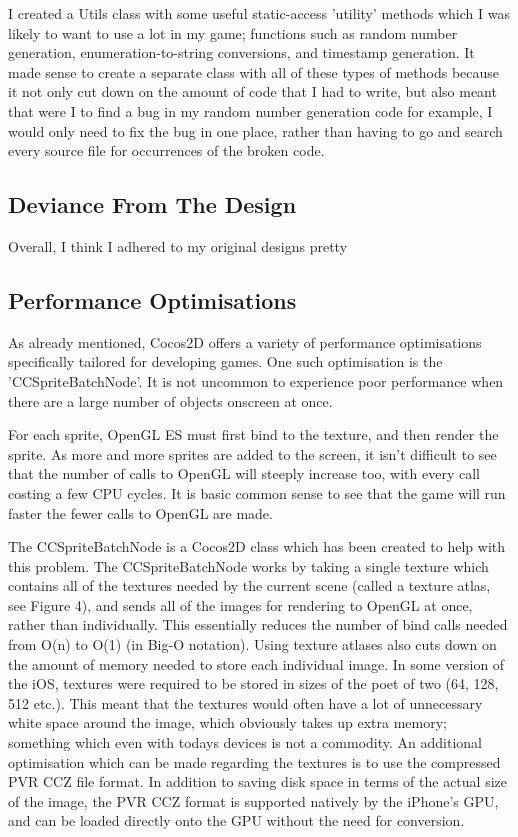 \documentclass[a4paper,oneside]{report}
\begin{document}
I created a Utils class with some useful static-access 'utility' methods which I was likely to want to use a lot in my game; functions such as random number generation, enumeration-to-string conversions, and timestamp generation. It made sense to create a separate class with all of these types of methods because it not only cut down on the amount of code that I had to write, but also meant that were I to find a bug in my random number generation code for example, I would only need to fix the bug in one place, rather than having to go and search every source file for occurrences of the broken code. 
		
\subsection{Deviance From The Design} 

Overall, I think I adhered to my original designs pretty 

\subsection{Performance Optimisations} 

As already mentioned, Cocos2D offers a variety of performance optimisations specifically tailored for developing games. One such optimisation is the 'CCSpriteBatchNode'. It is not uncommon to experience poor performance when there are a large number of objects onscreen at once. 

For each sprite, OpenGL ES must first bind to the texture, and then render the sprite. As more and more sprites are added to the screen, it isn't difficult to see that the number of calls to OpenGL will steeply increase too, with every call costing a few CPU cycles. It is basic common sense to see that the game will run faster the fewer calls to OpenGL are made. 

The CCSpriteBatchNode is a Cocos2D class which has been created to help with this problem. The CCSpriteBatchNode works by taking a single texture which contains all of the textures needed by the current scene (called a texture atlas, see Figure 4), and sends all of the images for rendering to OpenGL at once, rather than individually. This essentially reduces the number of bind calls needed from O(n) to O(1) (in Big-O notation). Using texture atlases also cuts down on the amount of memory needed to store each individual image. In some version of the iOS, textures were required to be stored in sizes of the poet of two (64, 128, 512 etc.). This meant that the textures would often have a lot of unnecessary white space around the image, which obviously takes up extra memory; something which even with todays devices is not a commodity. An additional optimisation which can be made regarding the textures is to use the compressed PVR CCZ file format. In addition to saving disk space in terms of the actual size of the image, the PVR CCZ format is supported natively by the iPhone's GPU, and can be loaded directly onto the GPU without the need for conversion.
\end{document}
